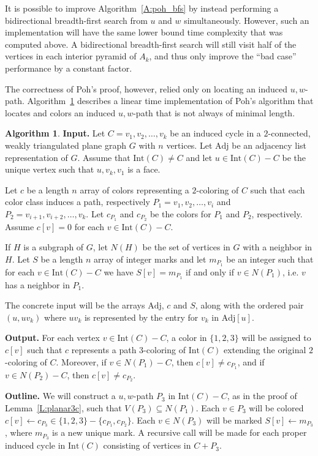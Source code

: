 \documentclass[12pt,letterpaper]{article}
\theoremstyle{plain}
\theoremstyle{definition}
\theoremstyle{break}
\newtheorem{algorithm}[lemma]{Algorithm}     %
\begin{document}
It is possible to improve Algorithm~\ref{A:poh_bfs} by instead
performing a bidirectional breadth-first search from $u$ and
$w$ simultaneously. However, such an implementation will have the
same lower bound time complexity that was
computed above. A bidirectional breadth-first search will still visit
half of the vertices in each interior pyramid of $A_k$, and
thus only improve the ``bad case'' performance by a constant factor.

The correctness of Poh's proof, however, relied only on
locating an induced $u,w$-path.
Algorithm~\ref{A:poh_linear} describes a linear time implementation
of Poh's algorithm that locates and colors an induced $u,w$-path that is not
always of minimal length.

\begin{algorithm}\label{A:poh_linear}
\textbf{Input.} Let $C=v_1,v_2,\ldots,v_k$ be an induced cycle
in a $2$-connected, weakly triangulated plane
graph $G$ with $n$ vertices.
Let $\text{Adj}$ be an adjacency list representation of $G$.
Assume that $\text{Int}(C)\ne C$ and
let $u\in\text{Int}(C)-C$ be the unique vertex such that $u,v_k,v_1$ is a face.

Let $c$ be a length $n$ array of colors
representing a $2$-coloring of $C$ such
that each color class induces a path, respectively $P_1=v_1,v_2,\ldots,v_i$ and
$P_2=v_{i+1},v_{i+2},\ldots,v_k$. Let $c_{P_1}$ and $c_{P_2}$ be the colors
for $P_1$ and $P_2$, respectively. Assume $c[v]=0$ for each
$v\in\text{Int}(C)-C$.

If $H$ is a subgraph of $G$, let $N(H)$ be the set of vertices in $G$ with a
neighbor in $H$. 
Let $S$ be a length $n$ array of integer marks and let $m_{P_1}$ be an integer
such that for each $v\in\text{Int}(C)-C$ we have $S[v]=m_{P_1}$ if and only if
$v\in N(P_1)$, i.e. $v$ has a neighbor in $P_1$.

The concrete input will be the arrays $\text{Adj}$, $c$ and $S$,
along with the ordered pair $(u, uv_k)$ where $uv_k$ is represented by the
entry for $v_k$ in $\text{Adj}[u]$.

\textbf{Output.} For each vertex $v\in\text{Int}(C)-C$, a color in
$\{1,2,3\}$ will be
assigned to $c[v]$ such that $c$ represents a path $3$-coloring of
$\text{Int}(C)$ extending the original $2$-coloring of $C$. Moreover, if
$v\in N(P_1)-C$, then $c[v]\ne c_{P_1}$, and if $v\in N(P_2)-C$, then
$c[v]\ne c_{P_2}$.

\textbf{Outline.} We will
construct a $u,w$-path $P_3$
in $\text{Int}(C)-C$, as in the proof of Lemma~\ref{L:planar3c},
such that $V(P_3)\subseteq N(P_1)$. Each $v\in P_3$ will be colored
$c[v]\leftarrow c_{P_3}\in \{1,2,3\}-\{c_{P_1},c_{P_2}\}$.
Each $v\in N(P_3)$ will be marked $S[v]\leftarrow m_{P_3}$, where $m_{P_3}$
is a new unique mark. A recursive call will be made for
each proper induced cycle in $\text{Int}(C)$ consisting of vertices in $C+P_3$.


\end{algorithm}
\end{document}
